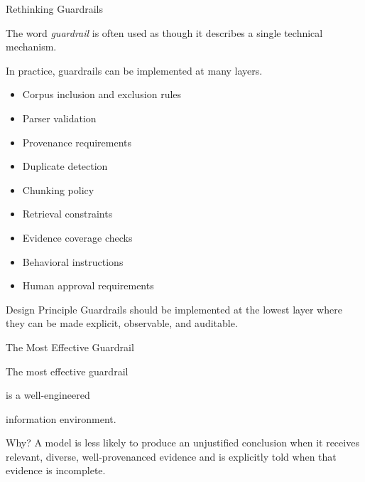 \documentclass[aspectratio=169]{beamer}
\begin{document}

\begin{frame}{Rethinking Guardrails}

The word \emph{guardrail} is often used as though it describes a single
technical mechanism.

\vspace{0.35cm}

In practice, guardrails can be implemented at many layers.

\begin{itemize}
\item Corpus inclusion and exclusion rules
\item Parser validation
\item Provenance requirements
\item Duplicate detection
\item Chunking policy
\item Retrieval constraints
\item Evidence coverage checks
\item Behavioral instructions
\item Human approval requirements
\end{itemize}

\vspace{0.05cm}

\begin{alertblock}{Design Principle}
Guardrails should be implemented at the lowest layer where they can
be made explicit, observable, and auditable.
\end{alertblock}

\end{frame}


\begin{frame}{The Most Effective Guardrail}

\centering

\vspace{0.5cm}

{\Huge
The most effective guardrail
}

\vspace{0.5cm}

{\Huge
is a well-engineered
}

\vspace{0.5cm}

{\Huge
information environment.
}

\vspace{0.9cm}

\begin{block}{Why?}
A model is less likely to produce an unjustified conclusion when it
receives relevant, diverse, well-provenanced evidence and is explicitly
told when that evidence is incomplete.
\end{block}

\end{frame}
\end{document}
